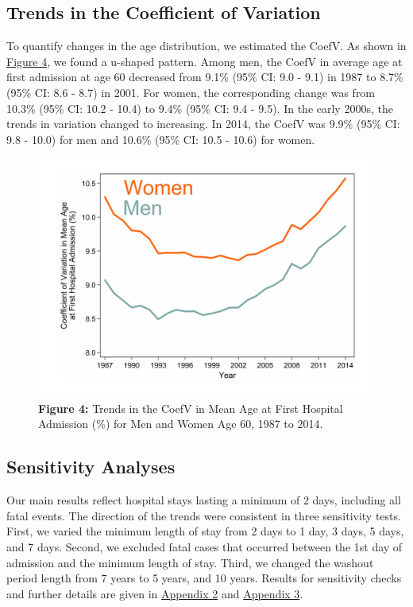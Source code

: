 \subsection{Trends in the Coefficient of Variation}

To quantify changes in the age distribution, we estimated the CoefV. As shown 
in \hyperref[ch4:fig4]{Figure 4}, we found a u-shaped pattern. Among men, the CoefV in average age 
at first admission at age 60 decreased from 9.1\% (95\% CI: 9.0 - 9.1) in 1987 
to 8.7\% (95\% CI: 8.6 - 8.7) in 2001. For women, the corresponding change was 
from 10.3\% (95\% CI: 10.2 - 10.4)  to 9.4\% (95\% CI: 9.4 - 9.5). In the early 
2000s, the trends in variation changed to increasing. In 2014, the CoefV was 
9.9\% (95\% CI: 9.8 - 10.0) for men and 10.6\% (95\% CI: 10.5 - 10.6) for women.\\

	\begin{figure}[H]
		\centering
		\includegraphics[scale=0.475]{Paper_3/Figure_4.pdf}
		\caption*{\textbf{Figure 4:} 	Trends in the CoefV in Mean Age at First 
										Hospital Admission (\%) for Men and Women 
										Age 60, 1987 to 2014.}
	\label{ch4:fig4}
	\end{figure}

\subsection{Sensitivity Analyses}

Our main results reflect hospital stays lasting a minimum of 2 days, including 
all fatal events. The direction of the trends were consistent in three sensitivity 
tests. First, we varied the minimum length of stay from 2 days to 1 day, 3 days, 
5 days, and 7 days. Second, we excluded fatal cases that occurred between the 1st 
day of admission and the minimum length of stay. Third, we changed the washout 
period length from 7 years to 5 years, and 10 years. Results for sensitivity 
checks and further details are given in \hyperref[ch4:app2]{Appendix 2} and 
\hyperref[ch4:app3]{Appendix 3}.\\


